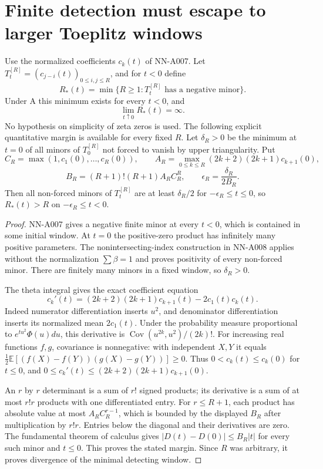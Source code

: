 \section{Finite detection must escape to larger Toeplitz windows}

\begin{theorem}
Use the normalized coefficients $c_k(t)$ of NN-A007. Let
$T_t^{[R]}=(c_{j-i}(t))_{0\le i,j\le R}$, and for $t<0$ define
\[
 R_*(t)=\min\{R\ge1:T_t^{[R]}\text{ has a negative minor}\}.
\]
Under A this minimum exists for every $t<0$, and
\[
 \lim_{t\uparrow0}R_*(t)=\infty.
\]
No hypothesis on simplicity of zeta zeros is used. The following
explicit quantitative margin is available for every fixed $R$.
Let $\delta_R>0$ be the minimum at $t=0$ of all minors of
$T_0^{[R]}$ not forced to vanish by upper triangularity. Put
\[
 C_R=\max(1,c_1(0),\ldots,c_R(0)),\qquad
 A_R=\max_{0\le k\le R}(2k+2)(2k+1)c_{k+1}(0),
\]
\[
 B_R=(R+1)!(R+1)A_RC_R^R,\qquad
 \epsilon_R=\frac{\delta_R}{2B_R}.
\]
Then all non-forced minors of $T_t^{[R]}$ are at least
$\delta_R/2$ for $-\epsilon_R\le t\le0$, so
$R_*(t)>R$ on $-\epsilon_R\le t<0$.
\end{theorem}
\begin{proof}
NN-A007 gives a negative finite minor at every $t<0$, which is
contained in some initial window. At $t=0$ the positive-zero product
has infinitely many positive parameters. The nonintersecting-index
construction in NN-A008 applies without the normalization $\sum\beta=1$
and proves positivity of every non-forced minor. There are finitely
many minors in a fixed window, so $\delta_R>0$.

The theta integral gives the exact coefficient equation
\[
 c_k'(t)=(2k+2)(2k+1)c_{k+1}(t)-2c_1(t)c_k(t).
\]
Indeed numerator differentiation inserts $u^2$, and denominator
differentiation inserts its normalized mean $2c_1(t)$.
Under the probability measure proportional to
$e^{tu^2}\Phi(u)du$, this derivative is
$\operatorname{Cov}(u^{2k},u^2)/(2k)!$.
For increasing real functions $f,g$, covariance is nonnegative:
with independent $X,Y$ it equals
$\frac12\mathbb E[(f(X)-f(Y))(g(X)-g(Y))]\ge0$.
Thus $0<c_k(t)\le c_k(0)$ for $t\le0$, and
$0\le c_k'(t)\le(2k+2)(2k+1)c_{k+1}(0)$.

An $r$ by $r$ determinant is a sum of $r!$ signed products; its
derivative is a sum of at most $r!r$ products with one differentiated
entry. For $r\le R+1$, each product has absolute value at most
$A_RC_R^{r-1}$, which is bounded by the displayed $B_R$ after
multiplication by $r!r$. Entries below the diagonal and their
derivatives are zero. The fundamental theorem of calculus gives
$|D(t)-D(0)|\le B_R|t|$ for every such minor and $t\le0$.
This proves the stated margin. Since $R$ was arbitrary, it proves
divergence of the minimal detecting window.
\end{proof}

